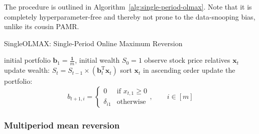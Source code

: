 The procedure is outlined in Algorithm~\ref{alg:single-period-olmax}. Note that it is completely hyperparameter-free and thereby not prone to the data-snooping bias, unlike its cousin PAMR.
\begin{algorithm}
  \caption{SingleOLMAX: Single-Period Online Maximum Reversion}
\label{alg:single-period-olmax}
  \begin{algorithmic}[1]
     initial portfolio $\mathbf{b}_1 = \frac{\mathbf{1}}{m}$, initial wealth $S_0 = 1$
      \STATE observe stock price relatives $\mathbf{x}_t$
      \STATE update wealth:
        $
          S_t = S_{t-1} \times (\mathbf{b}_t^\text{T}\mathbf{x}_t)
        $
        \STATE sort $\mathbf{x}_t$ in ascending order 
      \STATE update the portfolio:
	\begin{equation*}
		b_{t+1,i} =
		\begin{cases}
			0 & \text{if } x_{t,1} \geq 0 \\
			\delta_{i1} & \text{otherwise}
		\end{cases},
		\qquad i \in [m]
	\end{equation*}
	\ENDIF
    \ENDFOR
  \end{algorithmic}
\end{algorithm}

\subsubsection{Multiperiod mean reversion}

